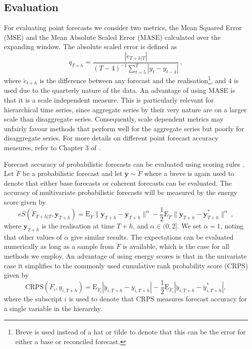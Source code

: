 \documentclass[a4paper, 11pt]{article}
\def\E{\text{E}}
\def\E{\text{E}}
\begin{document}
\subsection{Evaluation}

For evaluating point forecasts we consider two metrics, the Mean Squared Error (MSE) and the Mean Absolute Scaled Error (MASE) calculated over the expanding window. The absolute scaled error is defined as
\begin{equation*}
q_{T+h} = \frac{|\breve{e}_{T+h|T}|}{(T-4)^{-1}\sum_{t=5}^{T}|y_t - y_{t-4}|}\,,
\end{equation*}
where $\breve{e}_{t+h}$ is the difference between any forecast and the realisation\footnote{Breve is used instead of a hat or tilde to denote that this can be the error for either a base or reconciled forecast.}, and $4$ is used due to the quarterly nature of the data. An advantage of using MASE is that it is a scale independent measure. This is particularly relevant for hierarchical time series, since aggregate series by their very nature are on a larger scale than disaggregate series. Consequently, scale dependent metrics may unfairly favour methods that perform well for the aggregate series but poorly for disaggregate series. For more details on different point forecast accuracy measures, refer to Chapter 3 of \citet{HynAth2018}.

Forecast accuracy of probabilistic forecasts can be evaluated using scoring rules \citep{Gneiting2014}. Let $\breve{F}$ be a probabilistic forecast and let $\breve{\bm{y}}\sim \breve{F}$ where a breve is again used to denote that either base forecasts or coherent forecasts can be evaluated. The accuracy of multivariate probabilistic forecasts will be measured by the energy score given by
\begin{equation*}
eS(\breve{F}_{T+h|T},\bm{y}_{T+h}) =
\E_{\breve{F}}\|\breve{\bm{y}}_{T+h}-\bm{y}_{T+h}\|^\alpha
-\frac{1}{2}\E_{\breve{F}}\|\breve{\bm{y}}_{T+h}-\breve{\bm{y}}^*_{T+h}\|^\alpha\,,
\end{equation*} where $\bm{y}_{T+h}$ is the realisation at time $T+h$, and $\alpha\in (0,2]$. We set $\alpha=1$, noting that other values of $\alpha$ give similar results. The expectations can be evaluated numerically as long as a sample from $\breve{F}$ is available, which is the case for all methods we employ. An advantage of using energy scores is that in the univariate case it simplifies to the commonly used cumulative rank probability score (CRPS) given by
\begin{equation*}
\text{CRPS}(\breve{F}_i,y_{i,T+h}) = \E_{\breve{F}_i}|\breve{y}_{i,T+h}-y_{i,T+h}| - \frac{1}{2}\E_{\breve{F}_i}|\breve{y}_{i,T+h}-\breve{y}^*_{i,T+h}|,
\end{equation*}
where the subscript $i$ is used to denote that CRPS measures forecast accuracy for a single variable in the hierarchy.
\end{document}
